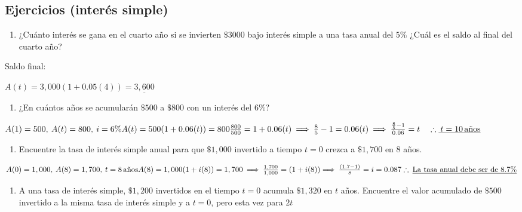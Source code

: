 \documentclass[
]{book}
\providecommand{\tightlist}{%
  \setlength{\itemsep}{0pt}\setlength{\parskip}{0pt}}
\theoremstyle{definition}
\theoremstyle{definition}
\theoremstyle{definition}
\theoremstyle{definition}
\theoremstyle{remark}
\begin{document}
\hypertarget{ejercicios-interuxe9s-simple}{%
\subsection{Ejercicios (interés simple)}\label{ejercicios-interuxe9s-simple}}

\begin{enumerate}
\def\labelenumi{\arabic{enumi}.}
\tightlist
\item
  ¿Cuánto interés se gana en el cuarto año si se invierten \(\$ 3000\) bajo interés simple a una tasa anual del \(5\%\) ¿Cuál es el saldo al final del cuarto año?
\end{enumerate}

Saldo final:

\(A(t) = 3,000(1+0.05(4)) = \underline{3,600}\)

\begin{enumerate}
\def\labelenumi{\arabic{enumi}.}
\setcounter{enumi}{1}
\tightlist
\item
  ¿En cuántos años se acumularán \(\$500\) a \(\$800\) con un interés del \(6\%\)?
\end{enumerate}

\(A(1) = 500, \: A(t) = 800, \: i = 6\% \\ A(t) = 500 (1 + 0.06(t)) = 800\\ \frac{800}{500} = 1+ 0.06 (t) \: \Longrightarrow \: \frac{8}{5}-1 = 0.06(t) \: \Longrightarrow \: \frac{\frac{8}{5}-1}{0.06} = t \quad \therefore\underline{\: t = 10 \, \text{años}}\)

\begin{enumerate}
\def\labelenumi{\arabic{enumi}.}
\setcounter{enumi}{2}
\tightlist
\item
  Encuentre la tasa de interés simple anual para que \(\$ 1,000\) invertido a tiempo \(t = 0\) crezca a \(\$1,700\) en 8 años.
\end{enumerate}

\(A(0) = 1,000, \: A(8) = 1,700, \: t=8 \, \text{años}\\A(8) = 1,000(1+i(8)) = 1,700 \: \Longrightarrow \: \frac{1,700}{1,000} = (1+i(8))\\ \Longrightarrow \: \frac{(1.7-1)}{8} = i = 0.087\\ \therefore \: \underline{\text{La tasa anual debe ser de } 8.7\%}\)

\begin{enumerate}
\def\labelenumi{\arabic{enumi}.}
\setcounter{enumi}{3}
\tightlist
\item
  A una tasa de interés simple, \(\$ 1,200\) invertidos en el tiempo \(t = 0\) acumula \(\$1,320\) en \(t\) años. Encuentre el valor acumulado de \(\$500\) invertido a la misma tasa de interés simple y a \(t = 0\), pero esta vez para \(2t\)
\end{enumerate}
\end{document}
